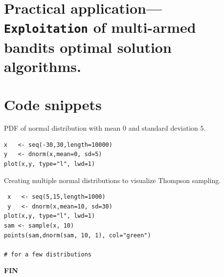 \documentclass[12pt, a4paper, pdflatex]{report}
\begin{document}
\chapter{Practical application--- \texttt{\textbf{Exploitation}} of multi-armed bandits optimal solution algorithms.}

\appendix
\chapter{Code snippets}

\label{snip:normaldist}PDF of normal distribution with mean $0$ and standard deviation $5$.
\begin{lstlisting}
x   <- seq(-30,30,length=10000)
y   <- dnorm(x,mean=0, sd=5)
plot(x,y, type="l", lwd=1)
\end{lstlisting}

\label{snip:thompsonsampling}Creating multiple normal distributions to visualize Thompson sampling.
\begin{lstlisting}
 x   <- seq(5,15,length=1000)
 y   <- dnorm(x,mean=10, sd=30)
plot(x,y, type="l", lwd=1)
sam <- sample(x, 10)
points(sam,dnorm(sam, 10, 1), col="green")

# for a few distributions
\end{lstlisting}


\newpage
\begin{center} \textbf{\huge \vspace*{15pt} FIN~\cite{berry+firstedt}} \end{center}

{}

\end{document}
